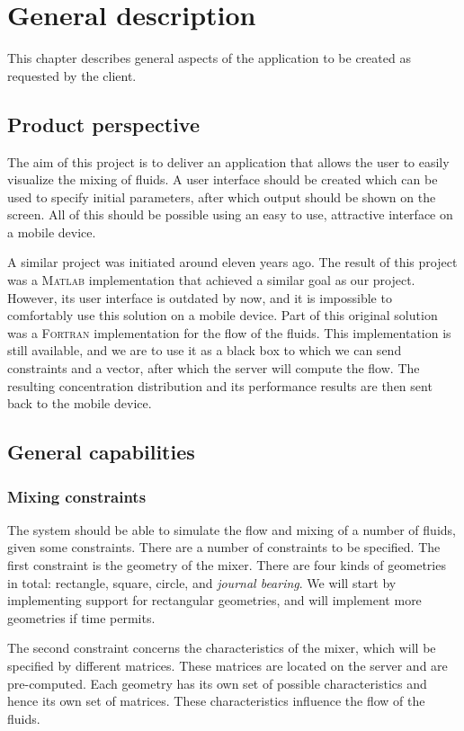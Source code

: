 \chapter{General description}
This chapter describes general aspects of the application to be created as requested by the client.

\section{Product perspective}
The aim of this project is to deliver an application that allows the user to easily visualize the mixing of fluids. A user interface should be created which can be used to specify initial parameters, after which output should be shown on the screen. All of this should be possible using an easy to use, attractive interface on a mobile device.

A similar project was initiated around eleven years ago. The result of this project was a \textsc{Matlab} implementation that achieved a similar goal as our project. However, its user interface is outdated by now, and it is impossible to comfortably use this solution on a mobile device. Part of this original solution was a \textsc{Fortran} implementation for the flow of the fluids. This implementation is still available, and we are to use it as a black box to which we can send constraints and a vector, after which the server will compute the flow. The resulting concentration distribution and its performance results are then sent back to the mobile device.

\section{General capabilities}
\subsection{Mixing constraints}
The system should be able to simulate the flow and mixing of a number of fluids, given some constraints. There are a number of constraints to be specified. The first constraint is the geometry of the mixer. There are four kinds of geometries in total: rectangle, square, circle, and \emph{journal bearing}. We will start by implementing support for rectangular geometries, and will implement more geometries if time permits.

The second constraint concerns the characteristics of the mixer, which will be specified by different matrices. These matrices are located on the server and are pre-computed. Each geometry has its own set of possible characteristics and hence its own set of matrices. These characteristics influence the flow of the fluids.

